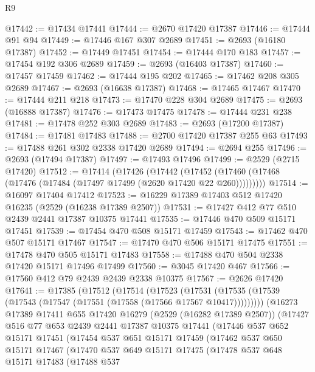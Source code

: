 \begin{lexlean}{R9}
\begin{coremodule}
@17442 := @17434 @17441
@17444 := @2670 @17420 @17387
@17446 := @17444 @91 @94
@17449 := @17446 @167 @307 @2689
@17451 := @2693 (@16180 @17387)
@17452 := @17449 @17451
@17454 := @17444 @170 @183
@17457 := @17454 @192 @306 @2689
@17459 := @2693 (@16403 @17387)
@17460 := @17457 @17459
@17462 := @17444 @195 @202
@17465 := @17462 @208 @305 @2689
@17467 := @2693 (@16638 @17387)
@17468 := @17465 @17467
@17470 := @17444 @211 @218
@17473 := @17470 @228 @304 @2689
@17475 := @2693 (@16888 @17387)
@17476 := @17473 @17475
@17478 := @17444 @231 @238
@17481 := @17478 @252 @303 @2689
@17483 := @2693 (@17200 @17387)
@17484 := @17481 @17483
@17488 := @2700 @17420 @17387 @255 @63
@17493 := @17488 @261 @302 @2338 @17420 @2689
@17494 := @2694 @255
@17496 := @2693 (@17494 @17387)
@17497 := @17493 @17496
@17499 := @2529 (@2715 @17420)
@17512 := @17414
    (@17426
      (@17442 (@17452 (@17460 (@17468 (@17476 (@17484 (@17497 @17499 (@2620 @17420 @22 @260)))))))))
@17514 := @16097 @17404 @17412
@17523 := @16229 @17389 @17403 @512 @17420 @16235 (@2529 (@16238 @17389 @2507))
@17531 := @17427 @412 @77 @510 @2439 @2441 @17387 @10375 @17441
@17535 := @17446 @470 @509 @15171 @17451
@17539 := @17454 @470 @508 @15171 @17459
@17543 := @17462 @470 @507 @15171 @17467
@17547 := @17470 @470 @506 @15171 @17475
@17551 := @17478 @470 @505 @15171 @17483
@17558 := @17488 @470 @504 @2338 @17420 @15171 @17496 @17499
@17560 := @3045 @17420 @467
@17566 := @17560 @412 @79 @2439 @2439 @2338 @10375
@17567 := @2626 @17420
@17641 := @17385
    (@17512
      (@17514
        (@17523
          (@17531 (@17535 (@17539 (@17543 (@17547 (@17551 (@17558 (@17566 @17567 @10417)))))))))
        (@16273
          @17389
          @17411
          @655
          @17420
          @16279
          (@2529 (@16282 @17389 @2507))
          (@17427
            @516
            @77
            @653
            @2439
            @2441
            @17387
            @10375
            @17441
            (@17446
              @537
              @652
              @15171
              @17451
              (@17454
                @537
                @651
                @15171
                @17459
                (@17462
                  @537
                  @650
                  @15171
                  @17467
                  (@17470
                    @537
                    @649
                    @15171
                    @17475
                    (@17478
                      @537
                      @648
                      @15171
                      @17483
                      (@17488
                        @537

\end{coremodule}
\end{lexlean}
